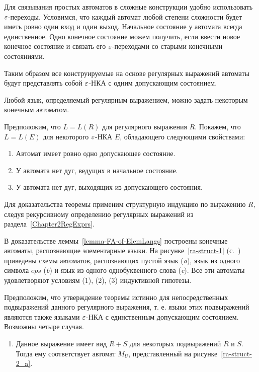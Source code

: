 Для связывания простых автоматов в сложные конструкции удобно 
использовать $\varepsilon$-переходы. Условимся, что каждый автомат любой 
степени сложности будет иметь ровно один вход и один выход. Начальное 
состояние у автомата всегда единственное. Одно конечное состояние можем 
получить, если ввести новое конечное состояние и связать его 
$\varepsilon$-переходами со старыми конечными состояниями.

Таким образом все конструируемые на основе регулярных выражений 
автоматы будут представлять собой $\varepsilon$-НКА с одним допускающим 
состоянием.

\begin{mytheorem}
Любой язык, определяемый регулярным выражением, можно задать некоторым 
конечным автоматом. 
\end{mytheorem}

\begin{myproof}

Предположим, что $L = L(R)$ для регулярного выражения $R$. Покажем, что  
$L = L(E)$ для некоторого $\varepsilon$-НКА $E$, обладающего следующими свойствами:
\begin{enumerate}
	\item Автомат имеет ровно одно допускающее состояние.
	\item У автомата нет дуг, ведущих в начальное состояние.
	\item У автомата нет дуг, выходящих из допускающего состояния.
\end{enumerate}
Для доказательства теоремы применим структурную индукцию по выражению $R$, 
следуя рекурсивному определению регулярных выражений из раздела~\ref{Chapter2RegExprs}.

В доказательстве леммы~\ref{lemma-FA-of-ElemLangs} построены конечные 
автоматы, распознающие элементарные языки. На рисунке~\ref{ra-struct-1}
(с.~\pageref{ra-struct-1})
приведены схемы автоматов, распознающих пустой язык (\textsl{a}), язык 
из одного символа $eps$ (\textsl{b}) и язык из одного однобуквенного 
слова (\textsl{c}). Все эти автоматы удовлетворяют условиям (1), (2), 
(3) индуктивной гипотезы.



Предположим, что утверждение теоремы истинно для непосредственных подвыражений данного регулярного выражения, т. е. языки этих подвыражений являются также языками $\varepsilon$-НКА с единственным допускающим состоянием. Возможны четыре случая.
\begin{enumerate}
\item Данное выражение имеет вид $R + S$ для некоторых подвыражений $R$ и $S$. Тогда ему соответствует автомат $M_U$, представленный на рисунке~\ref{ra-struct-2_a}.


\end{enumerate}
\end{myproof}
